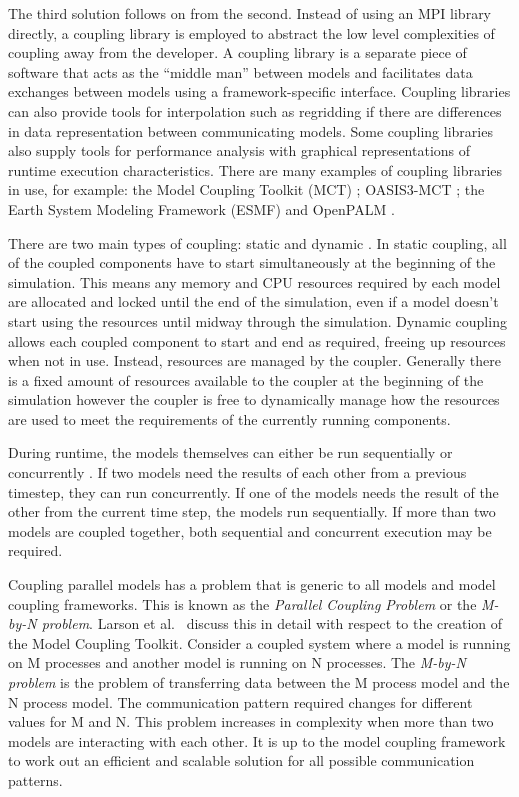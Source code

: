 \documentclass{acm_proc_article-sp}
\begin{document}
The third solution \cite{Thevenin} follows on from the second. Instead of using
an MPI library directly, a coupling library is employed to abstract the low
level complexities of coupling away from the developer. A coupling library is a
separate piece of software that acts as the ``middle man'' between models and
facilitates data exchanges between models using a framework-specific interface.
Coupling libraries can also provide tools for interpolation such as regridding
\cite{Kuinghttons} if there are differences in data representation between
communicating models. Some coupling libraries also supply tools for performance
analysis with graphical representations of runtime execution characteristics.
There are many examples of coupling libraries in use, for example: the Model
Coupling Toolkit (MCT) \cite{Larson2005,Jacob2005}; OASIS3-MCT
\cite{Valcke,Valcke2013}; the Earth System Modeling Framework (ESMF)
\cite{Ramework2004} and OpenPALM \cite{Piacentini2011}.

There are two main types of coupling: static and dynamic
\cite{Thevenin,Piacentini2011}. In static coupling, all of the coupled
components have to start simultaneously at the beginning of the simulation. This
means any memory and CPU resources required by each model are allocated and
locked until the end of the simulation, even if a model doesn't start using the
resources until midway through the simulation. Dynamic coupling allows each
coupled component to start and end as required, freeing up resources when not in
use. Instead, resources are managed by the coupler. Generally there is a fixed
amount of resources available to the coupler at the beginning of the simulation
however the coupler is free to dynamically manage how the resources are used to
meet the requirements of the currently running components.

During runtime, the models themselves can either be run sequentially or
concurrently \cite{Maisonnave}. If two models need the results of each other
from a previous timestep, they can run concurrently. If one of the models needs
the result of the other from the current time step, the models run sequentially.
If more than two models are coupled together, both sequential and concurrent
execution may be required.

Coupling parallel models has a problem that is generic to all models and model
coupling frameworks. This is known as the \textit{Parallel Coupling Problem} or
the \textit{M-by-N problem}. Larson et al.\ \cite{Larson2005,Jacob2005} discuss
this in detail with respect to the creation of the Model Coupling Toolkit.
Consider a coupled system where a model is running on M processes and another
model is running on N processes. The \textit{M-by-N problem} is the problem of
transferring data between the M process model and the N process model. The
communication pattern required changes for different values for M and N. This
problem increases in complexity when more than two models are interacting with
each other. It is up to the model coupling framework to work out an efficient
and scalable solution for all possible communication patterns.
\end{document}
